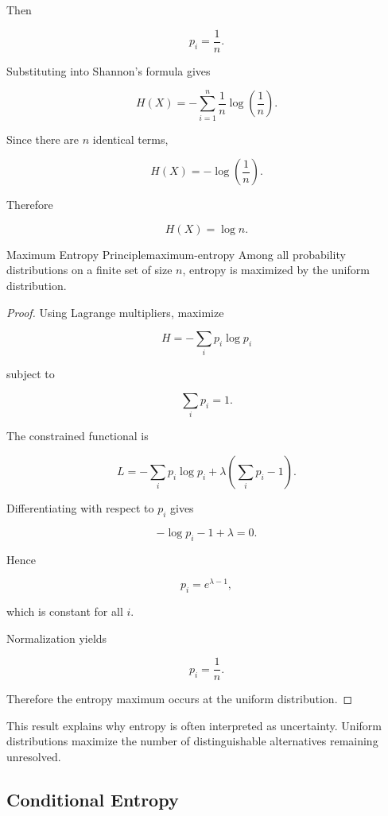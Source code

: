 \documentclass[12pt,twoside,openright]{book}
\begin{document}
Then

\[
p_i
=

\frac1n.
\]

Substituting into Shannon's formula gives

\[
H(X)
=

-\sum_{i=1}^{n}
\frac1n
\log\left(\frac1n\right).
\]

Since there are $n$ identical terms,

\[
H(X)
=

-\log\left(\frac1n\right).
\]

Therefore

\[
H(X)
=

\log n.
\]

\begin{proposition}{Maximum Entropy Principle}{maximum-entropy}
Among all probability distributions on a finite set of
size $n$, entropy is maximized by the uniform
distribution.
\end{proposition}

\begin{proof}
Using Lagrange multipliers, maximize

\[
H
=

-\sum_i p_i\log p_i
\]

subject to

\[
\sum_i p_i = 1.
\]

The constrained functional is

\[
L
=

-\sum_i p_i\log p_i
+
\lambda
\left(
\sum_i p_i-1
\right).
\]

Differentiating with respect to $p_i$ gives

\[
-\log p_i -1+\lambda =0.
\]

Hence

\[
p_i
=

e^{\lambda-1},
\]

which is constant for all $i$.

Normalization yields

\[
p_i
=

\frac1n.
\]

Therefore the entropy maximum occurs at the uniform
distribution.
\end{proof}

This result explains why entropy is often interpreted as
uncertainty. Uniform distributions maximize the number of
distinguishable alternatives remaining unresolved.

\subsection{Conditional Entropy}
\end{document}

